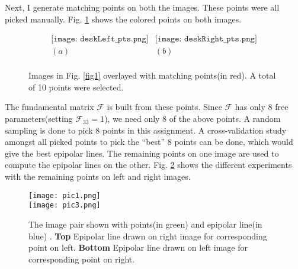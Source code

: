 \documentclass[11pt]{article}
\newcommand{\Ff}{\mathcal{F}}
\begin{document}
\par Next, I generate matching points on both the images.  These points were all picked manually. Fig. \ref{fig2} shows the colored points on both images.
    \vspace{-10pt}
\begin{figure}[!hbt]
\vspace{-10pt}
 \begin{center}
  \[ \begin{array}{cc}
	  \texttt{[image: deskLeft\_pts.png]} &
	  \texttt{[image: deskRight\_pts.png]} \\
	  (a) & (b) \\
	  \end{array} \]
  \end{center}
      \vspace{-10pt}
  \caption{ Images in Fig. \ref{fig1} overlayed with matching points(in red).  A total of 10 points were selected. }
  \label{fig2}
      \vspace{-10pt}
\end{figure}


\par The fundamental matrix $\Ff$ is built from these points.  Since $\Ff$ has only 8 free parameters(setting $\Ff_{33} = 1$), we need only 8 of the above points.  A random sampling is done to pick 8 points in this assignment. A cross-validation study amongst all picked points to pick the ``best'' 8 points can be done, which would give the best epipolar lines. The remaining points on one image are used to compute the epipolar lines on the other.  Fig. \ref{fig3} shows the different experiments with the remaining points on left and right images. 

\begin{figure}[!hbt]
\vspace{-10pt}
 \begin{center}
	  \texttt{[image: pic1.png]} \\
	  \texttt{[image: pic3.png]}
  \end{center}
      \vspace{-10pt}
  \caption{ The image pair shown with points(in green) and epipolar line(in blue) . {\bf Top} Epipolar line drawn on right image for corresponding point on left. {\bf Bottom} Epipolar line drawn on left image for corresponding point on right. }
  \label{fig3}
      \vspace{-10pt}
\end{figure}
\end{document}
